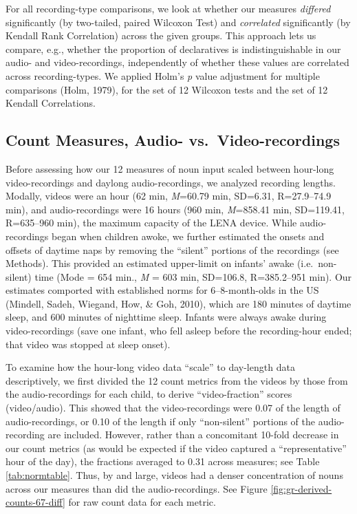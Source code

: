 \documentclass[man]{apa6}
\theoremstyle{definition}
\theoremstyle{definition}
\theoremstyle{definition}
\theoremstyle{remark}
\begin{document}
For all recording-type comparisons, we look at whether our measures
\emph{differed} significantly (by two-tailed, paired Wilcoxon Test) and
\emph{correlated} significantly (by Kendall Rank Correlation) across the
given groups. This approach lets us compare, e.g., whether the
proportion of declaratives is indistinguishable in our audio- and
video-recordings, independently of whether these values are correlated
across recording-types. We applied Holm's \emph{p} value adjustment for
multiple comparisons (Holm, 1979), for the set of 12 Wilcoxon tests and
the set of 12 Kendall Correlations.

\subsection{Count Measures, Audio-
vs.~Video-recordings}\label{count-measures-audio--vs.video-recordings}

Before assessing how our 12 measures of noun input scaled between
hour-long video-recordings and daylong audio-recordings, we analyzed
recording lengths. Modally, videos were an hour (62 min, \emph{M}=60.79
min, SD=6.31, R=27.9--74.9 min), and audio-recordings were 16 hours (960
min, \emph{M}=858.41 min, SD=119.41, R=635--960 min), the maximum
capacity of the LENA device. While audio-recordings began when children
awoke, we further estimated the onsets and offsets of daytime naps by
removing the \enquote{silent} portions of the recordings (see Methods).
This provided an estimated upper-limit on infants' awake
(i.e.~non-silent) time (Mode = 654 min., \emph{M} = 603 min, SD=106.8,
R=385.2--951 min). Our estimates comported with established norms for
6--8-month-olds in the US (Mindell, Sadeh, Wiegand, How, \& Goh, 2010),
which are 180 minutes of daytime sleep, and 600 minutes of nighttime
sleep. Infants were always awake during video-recordings (save one
infant, who fell asleep before the recording-hour ended; that video was
stopped at sleep onset).

To examine how the hour-long video data \enquote{scale} to day-length
data descriptively, we first divided the 12 count metrics from the
videos by those from the audio-recordings for each child, to derive
\enquote{video-fraction} scores (video/audio). This showed that the
video-recordings were 0.07 of the length of audio-recordings, or 0.10 of
the length if only \enquote{non-silent} portions of the audio-recording
are included. However, rather than a concomitant 10-fold decrease in our
count metrics (as would be expected if the video captured a
\enquote{representative} hour of the day), the fractions averaged to
0.31 across measures; see Table \ref{tab:normtable}. Thus, by and large,
videos had a denser concentration of nouns across our measures than did
the audio-recordings. See Figure \ref{fig:gr-derived-counts-67-diff} for
raw count data for each metric.
\end{document}
